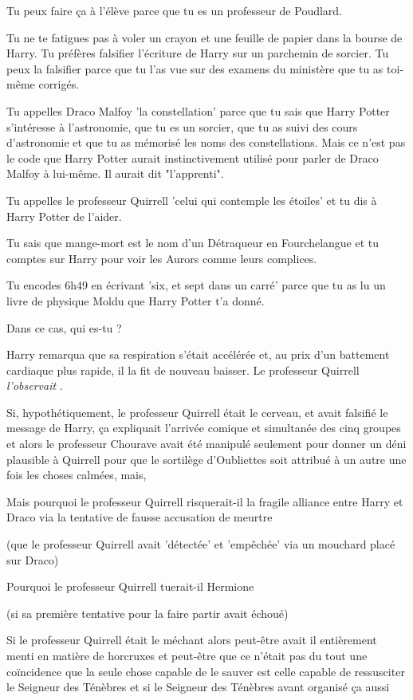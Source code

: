 Tu peux faire ça à l'élève parce que tu es un professeur de Poudlard.

Tu ne te fatigues pas à voler un crayon et une feuille de papier dans la bourse de Harry. Tu préfères falsifier l'écriture de Harry sur un parchemin de sorcier. Tu peux la falsifier parce que tu l'as vue sur des examens du ministère que tu as toi-même corrigés.

Tu appelles Draco Malfoy 'la constellation' parce que tu sais que Harry Potter s'intéresse à l'astronomie, que tu es un sorcier, que tu as suivi des cours d'astronomie et que tu as mémorisé les noms des constellations. Mais ce n'est pas le code que Harry Potter aurait instinctivement utilisé pour parler de Draco Malfoy à lui-même. Il aurait dit "l'apprenti".

Tu appelles le professeur Quirrell 'celui qui contemple les étoiles' et tu dis à Harry Potter de l'aider.

Tu sais que mange-mort est le nom d'un Détraqueur en Fourchelangue et tu comptes sur Harry pour voir les Aurors comme leurs complices.

Tu encodes 6h49 en écrivant 'six, et sept dans un carré' parce que tu as lu un livre de physique Moldu que Harry Potter t'a donné.

Dans ce cas, qui es-tu ?

Harry remarqua que sa respiration s'était accélérée et, au prix d'un battement cardiaque plus rapide, il la fit de nouveau baisser. Le professeur Quirrell \emph{l'observait} .

Si, hypothétiquement, le professeur Quirrell était le cerveau, et avait falsifié le message de Harry, ça expliquait l'arrivée comique et simultanée des cinq groupes et alors le professeur Chourave avait été manipulé seulement pour donner un déni plausible à Quirrell pour que le sortilège d'Oubliettes soit attribué à un autre une fois les choses calmées, mais,

Mais pourquoi le professeur Quirrell risquerait-il la fragile alliance entre Harry et Draco via la tentative de fausse accusation de meurtre

(que le professeur Quirrell avait 'détectée' et 'empêchée' via un mouchard placé sur Draco)

Pourquoi le professeur Quirrell tuerait-il Hermione

(si sa première tentative pour la faire partir avait échoué)

Si le professeur Quirrell était le méchant alors peut-être avait il entièrement menti en matière de horcruxes et peut-être que ce n'était pas du tout une coïncidence que la seule chose capable de le sauver est celle capable de ressusciter le Seigneur des Ténèbres et si le Seigneur des Ténèbres avant organisé ça aussi

